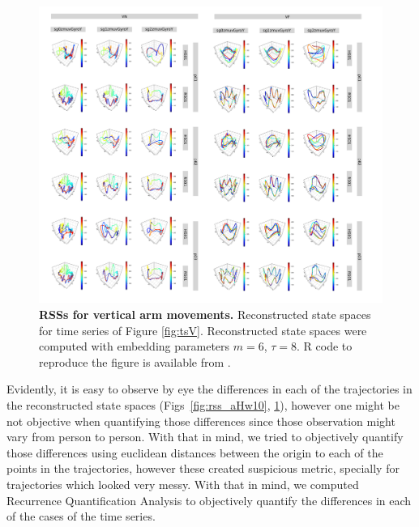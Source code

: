 \begin{figure}[!h]
\centering
\includegraphics[width=1.0\textwidth]{rss_aV}
    \caption{
	{\bf RSSs for vertical arm movements.}
	Reconstructed state spaces for time series of Figure \ref{fig:tsV}.
	Reconstructed state spaces were computed with 
	embedding parameters $m=6$, $\tau=8$.
	R code to reproduce the figure is available from \cite{hwum2018}.
        }
    \label{fig:rss_aVw10}
\end{figure}

Evidently, it is easy to observe by eye the differences in each of the
trajectories in the reconstructed state spaces (Figs~\ref{fig:rss_aHw10}, \ref{fig:rss_aVw10}), 
however one might be not objective when quantifying those differences 
since those observation might vary from person to person.
With that in mind, we tried to objectively quantify those differences 
using euclidean distances between the origin to each of the points in the trajectories,
however these created suspicious metric, specially 
for trajectories which looked very messy.
With that in mind, we computed Recurrence Quantification Analysis
to objectively quantify the differences in each of the cases of
the time series.







